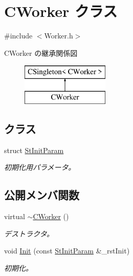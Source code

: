 \hypertarget{class_c_worker}{}\section{C\+Worker クラス}
\label{class_c_worker}


{\ttfamily \#include $<$Worker.\+h$>$}

C\+Worker の継承関係図\begin{figure}[H]
\begin{center}
\leavevmode
\includegraphics[height=2.000000cm]{class_c_worker}
\end{center}
\end{figure}
\subsection*{クラス}
\begin{DoxyCompactItemize}
\item 
struct \hyperlink{struct_c_worker_1_1_st_init_param}{St\+Init\+Param}
\begin{DoxyCompactList}\small\item\em 初期化用パラメータ。 \end{DoxyCompactList}\end{DoxyCompactItemize}
\subsection*{公開メンバ関数}
\begin{DoxyCompactItemize}
\item 
virtual \hyperlink{class_c_worker_ad7463ab6b440816bc9b8c1b2da167407}{$\sim$\+C\+Worker} ()
\begin{DoxyCompactList}\small\item\em デストラクタ。 \end{DoxyCompactList}\item 
void \hyperlink{class_c_worker_ad5d23dd82cbc33909e00146dfc5b039b}{Init} (const \hyperlink{struct_c_worker_1_1_st_init_param}{St\+Init\+Param} \&\+\_\+rst\+Init)
\begin{DoxyCompactList}\small\item\em 初期化。 \end{DoxyCompactList}\end{DoxyCompactItemize}
